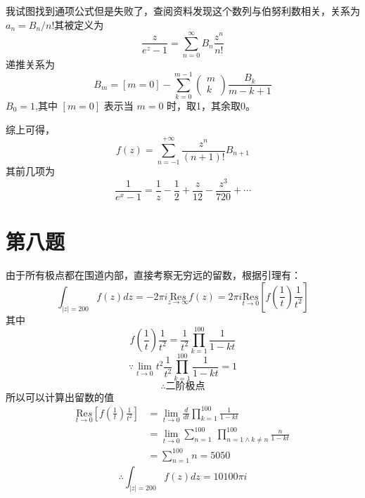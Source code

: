 \documentclass[a4paper]{ctexart}
\begin{document}
我试图找到通项公式但是失败了，查阅资料发现这个数列与伯努利数相关，关系为$a_n=B_n/n!$其被定义为
$$\frac{z}{e^{z}-1}=\sum_{n=0}^{\infty} B_{n} \frac{z^{n}}{n !}$$
递推关系为
$$B_{m}=[m=0]-\sum_{k=0}^{m-1}\left(\begin{array}{c}
            m \\
            k
        \end{array}\right) \frac{B_{k}}{m-k+1}$$
$B_0=1$,其中 $[m=0]$ 表示当 $m=0$ 时，取1，其余取0。

综上可得，
$$
    f\left( z \right) =\sum_{n=-1}^{+\infty}{\frac{z^n}{\left( n+1 \right) !}B_{n+1}}
$$
其前几项为
$$
\frac{1}{e^x-1}=\frac{1}{z}-\frac{1}{2}+\frac{z}{12}-\frac{z^3}{720}+\cdots 
$$

\section{第八题}
由于所有极点都在围道内部，直接考察无穷远的留数，根据引理有：
$$
    \int_{|z|=200}{f\left( z \right) dz}=-2\pi i\underset{z\rightarrow \infty}{\text{Re}s}f\left( z \right) =2\pi i\underset{t\rightarrow 0}{\text{Re}s}\left[ f\left( \frac{1}{t} \right) \frac{1}{t^2} \right]
$$
其中
$$
    f\left( \frac{1}{t} \right) \frac{1}{t^2}=\frac{1}{t^2}\prod_{k=1}^{100}{\frac{1}{1-kt}}
$$
$$
    \because \underset{t\rightarrow 0}{\lim}t^2\frac{1}{t^2}\prod_{k=1}^{100}{\frac{1}{1-kt}}=1
$$
$$
    \therefore \text{二阶极点}
$$
所以可以计算出留数的值
$$
    \begin{aligned}
        \underset{t\rightarrow 0}{\text{Re}s}\left[ f\left( \frac{1}{t} \right) \frac{1}{t^2} \right]
         & =\underset{t\rightarrow 0}{\lim}\frac{d}{dt}\prod_{k=1}^{100}{\frac{1}{1-kt}}                      \\
         & =\underset{t\rightarrow 0}{\lim}\sum_{n=1}^{100}{\ \prod_{n=1 \land k\ne n}^{100}{\frac{n}{1-kt}}} \\
         & =\sum_{n=1}^{100}{n}=5050
    \end{aligned}
$$
$$
    \therefore \int_{|z|=200}{f\left( z \right) dz}=10100\pi i
$$
\end{document}
